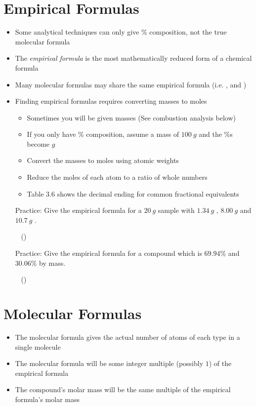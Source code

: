 \documentclass[12pt, openany, letterpaper]{memoir}
\begin{document}
\section{Empirical Formulas}
\begin{itemize}
	\item Some analytical techniques can only give \% composition, not the true molecular formula
	\item The \emph{empirical formula} is the most mathematically reduced form of a chemical formula
	\item Many molecular formulas may share the same empirical formula (i.e. ,  and )
	\item Finding empirical formulas requires converting masses to moles
	      \begin{itemize}
		      \item Sometimes you will be given masses (See combustion analysis below)
		      \item If you only have \% composition, assume a mass of $100~g$ and the \%s become $g$
		      \item Convert the masses to moles using atomic weights
		      \item Reduce the moles of each atom to a ratio of whole numbers
		      \item Table 3.6 shows the decimal ending for common fractional equivalents
	      \end{itemize}

	      Practice: Give the empirical formula for a $20~g$ sample with $1.34~g$ , $8.00~g$  and $10.7~g$ .

	      ~\hphantom{Practice:} ()

	      Practice: Give the empirical formula for a compound which is $69.94\%$  and $30.06\%$  by mass.

	      ~\hphantom{Practice:} ()
\end{itemize}
\section{Molecular Formulas}
\begin{itemize}
	\item The molecular formula gives the actual number of atoms of each type in a single molecule
	\item The molecular formula will be some integer multiple (possibly $1$) of the empirical formula
	\item The compound's molar mass will be the same multiple of the empirical formula's molar mass
\end{itemize}
\end{document}

